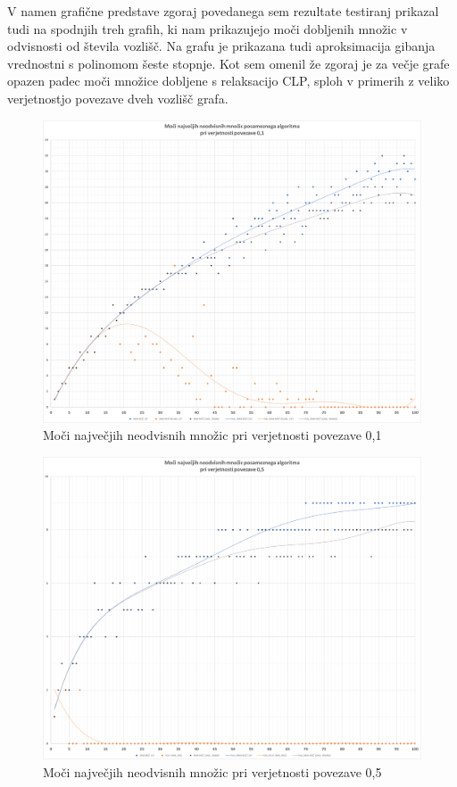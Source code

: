 \documentclass[a4paper, 12 pt]{article}
\theoremstyle{definition}
\theoremstyle{plain}
\theoremstyle{remark}
\begin{document}
V namen grafične predstave zgoraj povedanega sem rezultate testiranj prikazal tudi na spodnjih treh grafih, ki nam prikazujejo moči dobljenih množic v odvisnosti od števila vozlišč. Na grafu je prikazana tudi aproksimacija gibanja vrednostni s polinomom šeste stopnje. Kot sem omenil že zgoraj je za večje grafe opazen padec moči množice dobljene s relaksacijo CLP, sploh v primerih z veliko verjetnostjo povezave dveh vozlišč grafa. 
\begin{figure}[H]
\centering
  \includegraphics[scale=0.28]{0,1 moci.png}
  \caption{Moči največjih neodvisnih množic pri verjetnosti povezave 0,1}
  \label{fig:moc0,1} 
\end{figure}

\begin{figure}[H]
\centering
  \includegraphics[scale=0.28]{0,5 moci.png}
  \caption{Moči največjih neodvisnih množic pri verjetnosti povezave 0,5}
  \label{fig:moc0,5} 
\end{figure}
\end{document}
